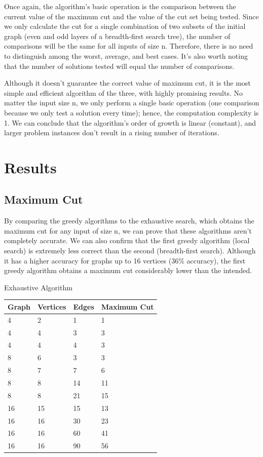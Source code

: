 \documentclass[]{revdetua}
\begin{document}
Once again, the algorithm's basic operation is the comparison between the current value of the maximum cut and the value of the cut set being tested. Since we only calculate the cut for a single combination of two subsets of the initial graph (even and odd layers of a breadth-first search tree), the number of comparisons will be the same for all inputs of size n. Therefore, there is no need to distinguish among the worst, average, and best cases. It's also worth noting that the number of solutions tested will equal the number of comparisons.

Although it doesn't guarantee the correct value of maximum cut, it is the most simple and efficient algorithm of the three, with highly promising results. No matter the input size n, we only perform a single basic operation (one comparison because we only test a solution every time); hence, the computation complexity is 1. We can conclude that the algorithm's order of growth is linear (constant), and larger problem instances don't result in a rising number of iterations.

\section{Results}

\subsection{Maximum Cut}

By comparing the greedy algorithms to the exhaustive search, which obtains the maximum cut for any input of size n, we can prove that these algorithms aren't completely accurate. We can also confirm that the first greedy algorithm (local search) is extremely less correct than the second (breadth-first search). Although it has a higher accuracy for graphs up to 16 vertices (36\% accuracy), the first greedy algorithm obtains a maximum cut considerably lower than the intended. 

\begin{table}[!ht]
    \centering
    Exhaustive Algorithm
    \begin{tabular}{|l|l|l|l|}
    \hline
        Graph         & Vertices      & Edges       & Maximum Cut      \\ \hline
        4 & 2 & 1 & 1 \\ \hline
        4 & 4 & 3 & 3 \\ \hline
        4 & 4 & 4 & 3 \\ \hline
        8 & 6 & 3 & 3 \\ \hline
        8 & 7 & 7 & 6 \\ \hline
        8 & 8 & 14 & 11 \\ \hline
        8 & 8 & 21 & 15 \\ \hline
        16 & 15 & 15 & 13 \\ \hline
        16 & 16 & 30 & 23 \\ \hline
        16 & 16 & 60 & 41 \\ \hline
        16 & 16 & 90 & 56 \\ \hline
    \end{tabular}
\end{table}
\end{document}
